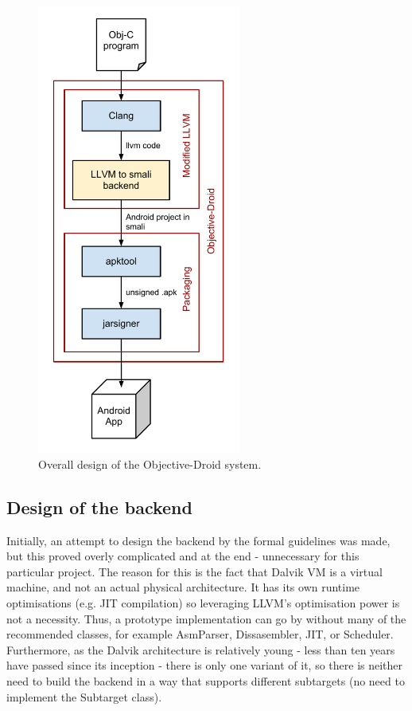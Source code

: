 \documentclass[parskip]{cs4rep}
\begin{document}
\begin{figure}[htp]
    \centering
        \includegraphics[width=0.6\textwidth]{design}
    \caption{Overall design of the Objective-Droid system.}
    \label{fig:design}    
\end{figure}

\subsection{Design of the backend} \label{sec:designOfTheBackend}

Initially, an attempt to design the backend by the formal guidelines\cite{P8} was made, but this proved overly complicated and at the end - unnecessary for this particular project. The reason for this is the fact that Dalvik VM is a virtual machine, and not an actual physical architecture. It has its own runtime optimisations (e.g. JIT compilation) so leveraging LLVM's optimisation power is not a necessity. Thus, a prototype implementation can go by without many of the recommended classes, for example AsmParser, Dissasembler, JIT, or Scheduler. Furthermore, as the Dalvik architecture is relatively young - less than ten years have passed since its inception - there is only one variant of it, so there is neither need to build the backend in a way that supports different subtargets (no need to implement the Subtarget class).
\end{document}
